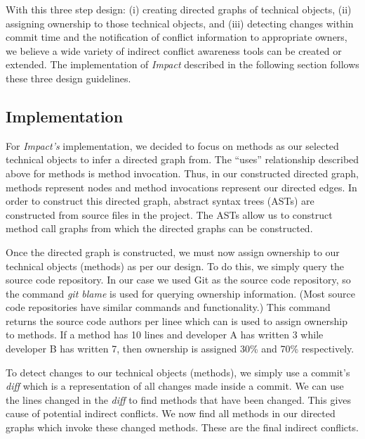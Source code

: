 \documentclass[conference]{IEEEtran}
\begin{document}
With this three step design: (i) creating directed graphs of technical
objects, (ii) assigning ownership to those technical objects, and (iii)
detecting changes within commit time and the notification of conflict information
to appropriate owners, we believe a wide variety of
indirect conflict awareness tools can be created or extended. The
implementation of \textit{Impact} described in the following section follows these
three design guidelines.

\subsection{Implementation}
For \textit{Impact's} implementation, we decided to focus on methods as our
selected technical objects to infer a directed graph from. The ``uses'' 
relationship described above for methods is method invocation.
Thus, in our constructed directed graph, methods represent nodes
and method invocations represent our directed edges. In order to 
construct this directed graph, abstract syntax trees (ASTs) are 
constructed from source files in the project. The ASTs allow us
to construct method call graphs from which the directed 
graphs can be constructed.

Once the directed graph is constructed, we must now assign
ownership to our technical objects (methods) as per our design.
To do this, we simply query the source code repository. In our case
we used Git as the source code repository, so the command \textit{git blame}
is used for querying ownership information. (Most source code 
repositories have similar commands and functionality.) This command 
returns the source code authors per linee which can is used to assign
ownership to methods. If a method has 10 lines and developer A
has written 3 while developer B has written 7, then ownership is
assigned 30\% and 70\% respectively.

To detect changes to our technical objects (methods), we simply 
use a commit's \textit{diff} which is a representation of all changes
made inside a commit. We can use the lines changed in the \textit{diff} to 
find methods that have been changed. This gives cause of potential
indirect conflicts. We now find all methods in our directed graphs
which invoke these changed methods. These are the final indirect
conflicts.
\end{document}
